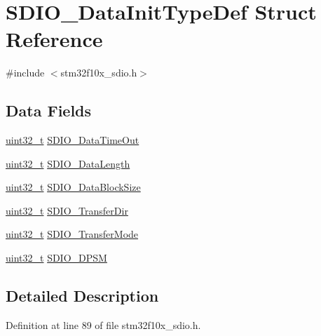 \hypertarget{struct_s_d_i_o___data_init_type_def}{\section{S\-D\-I\-O\-\_\-\-Data\-Init\-Type\-Def Struct Reference}
\label{struct_s_d_i_o___data_init_type_def}
}


{\ttfamily \#include $<$stm32f10x\-\_\-sdio.\-h$>$}

\subsection*{Data Fields}
\begin{DoxyCompactItemize}
\item 
\hyperlink{stdint_8h_a435d1572bf3f880d55459d9805097f62}{uint32\-\_\-t} \hyperlink{struct_s_d_i_o___data_init_type_def_a6877ec1042a273e228114e5362b93aa1}{S\-D\-I\-O\-\_\-\-Data\-Time\-Out}
\item 
\hyperlink{stdint_8h_a435d1572bf3f880d55459d9805097f62}{uint32\-\_\-t} \hyperlink{struct_s_d_i_o___data_init_type_def_ac325889a6dd582130a752aafc3ec9ee9}{S\-D\-I\-O\-\_\-\-Data\-Length}
\item 
\hyperlink{stdint_8h_a435d1572bf3f880d55459d9805097f62}{uint32\-\_\-t} \hyperlink{struct_s_d_i_o___data_init_type_def_a2252d17c4b3182830eb9f400489cb10f}{S\-D\-I\-O\-\_\-\-Data\-Block\-Size}
\item 
\hyperlink{stdint_8h_a435d1572bf3f880d55459d9805097f62}{uint32\-\_\-t} \hyperlink{struct_s_d_i_o___data_init_type_def_a4838fffdb3f87850569dff12f15485db}{S\-D\-I\-O\-\_\-\-Transfer\-Dir}
\item 
\hyperlink{stdint_8h_a435d1572bf3f880d55459d9805097f62}{uint32\-\_\-t} \hyperlink{struct_s_d_i_o___data_init_type_def_a58ac19aaaceb2791d4bbcd30f334dd21}{S\-D\-I\-O\-\_\-\-Transfer\-Mode}
\item 
\hyperlink{stdint_8h_a435d1572bf3f880d55459d9805097f62}{uint32\-\_\-t} \hyperlink{struct_s_d_i_o___data_init_type_def_ad5eb5f3c6fd9e5d4a6664c5cf57d6b03}{S\-D\-I\-O\-\_\-\-D\-P\-S\-M}
\end{DoxyCompactItemize}


\subsection{Detailed Description}


Definition at line 89 of file stm32f10x\-\_\-sdio.\-h.



